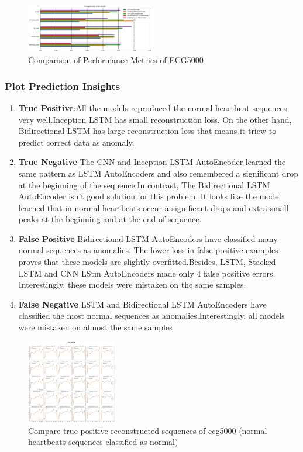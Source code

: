 \documentclass[nonacm,sigconf]{acmart}
\begin{document}
\begin{figure}[h]
  \centering
  \includegraphics[width=0.5\textwidth]{ecg5000/performance.png}
  \caption{Comparison of Performance Metrics of ECG5000}
  \label{tab:Fig1}
\end{figure}


\subsubsection{\textbf{Plot Prediction Insights}}
\begin{enumerate}
    \item \textbf{True Positive}:All the models reproduced the normal heartbeat sequences very well.Inception LSTM has small reconstruction loss. On the other hand, Bidirectional LSTM has large reconstruction loss that means it triew to predict correct data as anomaly.
    \item \textbf{True Negative}
    The CNN and Inception LSTM AutoEncoder learned the same pattern as LSTM AutoEncoders and also remembered a significant drop at the beginning of the sequence.In contrast, The Bidirectional LSTM AutoEncoder isn't good solution for this problem. It looks like the model learned that in normal heartbeats occur a significant drops and extra small peaks at the beginning and at the end of sequence.

    \item \textbf{False Positive}
    Bidirectional LSTM AutoEncoders have classified many normal sequences as anomalies. The lower loss in false positive examples proves that these models are slightly overfitted.Besides, LSTM, Stacked LSTM and CNN LStm AutoEncoders made only 4 false positive errors. Interestingly, these models were mistaken on the same samples.

    \item \textbf{False Negative}
    LSTM and Bidirectional LSTM AutoEncoders have classified the most normal sequences as anomalies.Interestingly, all models were mistaken on almost the same samples    
\end{enumerate}
    \begin{figure}
        \centering
        \includegraphics[width=0.35\textwidth]{ecg5000/TP.png}
        \caption{Compare true positive reconstructed sequences of ecg5000 (normal heartbeats sequences classified as normal)}
        \label{fig:image1}
    \end{figure}%
\end{document}
